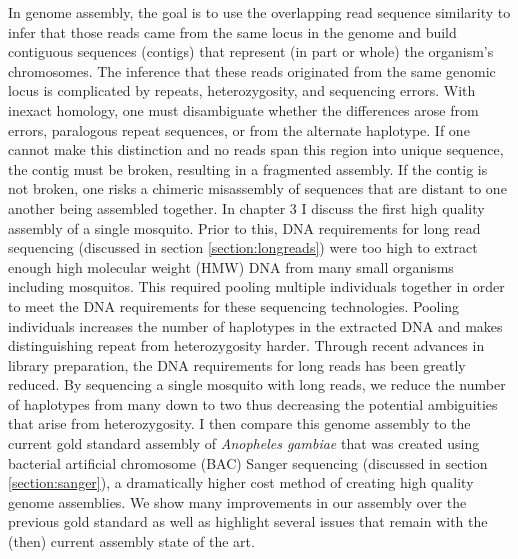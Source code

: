 \par{
In genome assembly, the goal is to use the overlapping read sequence similarity to infer that those reads came from the same locus in the genome and build contiguous sequences (contigs) that represent (in part or whole) the organism's chromosomes. The inference that these reads originated from the same genomic locus is complicated by repeats, heterozygosity, and sequencing errors. With inexact homology, one must disambiguate whether the differences arose from errors, paralogous repeat sequences, or from the alternate haplotype. If one cannot make this distinction and no reads span this region into unique sequence, the contig must be broken, resulting in a fragmented assembly. If the contig is not broken, one risks a chimeric misassembly of sequences that are distant to one another being assembled together. In chapter 3 I discuss the first high quality assembly of a single mosquito. Prior to this, DNA requirements for long read sequencing (discussed in section \ref{section:longreads}) were too high to extract enough high molecular weight (HMW) DNA from many small organisms including mosquitos. This required pooling multiple individuals together in order to meet the DNA requirements for these sequencing technologies. Pooling individuals increases the number of haplotypes in the extracted DNA and makes distinguishing repeat from heterozygosity harder. Through recent advances in library preparation, the DNA requirements for long reads has been greatly reduced. By sequencing a single mosquito with long reads, we reduce the number of haplotypes from many down to two thus decreasing the potential ambiguities that arise from heterozygosity. I then compare this genome assembly to the current gold standard assembly of \textit{Anopheles gambiae} that was created using bacterial artificial chromosome (BAC) Sanger sequencing (discussed in section \ref{section:sanger}), a dramatically higher cost method of creating high quality genome assemblies. We show many improvements in our assembly over the previous gold standard as well as highlight several issues that remain with the (then) current assembly state of the art.
} 



